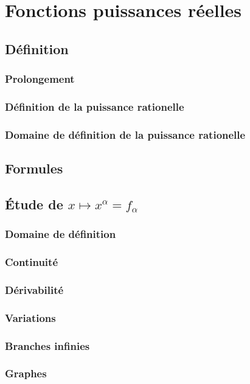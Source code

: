 \documentclass[12pt,a4paper,french]{book}
\begin{document}
	\section{Fonctions puissances réelles}
		\subsection{Définition}
			\subsubsection{Prolongement}
			\subsubsection{Définition de la puissance rationelle}
			
			\subsubsection{Domaine de définition de la puissance rationelle}
			
		\subsection{Formules}
		
		\subsection{Étude de $x\mapsto x^{\alpha} = f_{\alpha}$}
			\subsubsection{Domaine de définition}
			\subsubsection{Continuité}
			\subsubsection{Dérivabilité}
			\subsubsection{Variations}
			\subsubsection{Branches infinies}
			\subsubsection{Graphes}
\end{document}
